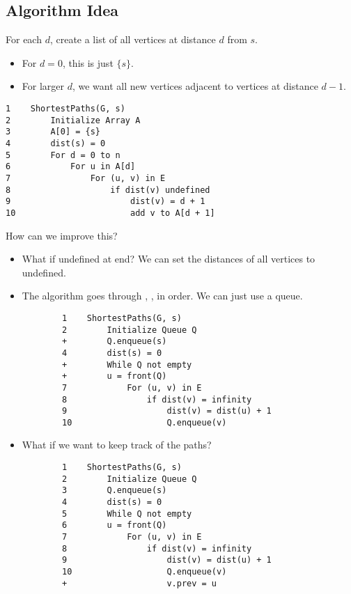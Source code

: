 \documentclass[letterpaper]{article}
\begin{document}
\subsection{Algorithm Idea}
For each $d$, create a list of all vertices at distance $d$ from $s$.
\begin{itemize}
    \item For $d = 0$, this is just $\{s\}$.
    \item For larger $d$, we want all new vertices adjacent to vertices at distance $d - 1$.
\end{itemize}

\begin{verbatim}
1    ShortestPaths(G, s)
2        Initialize Array A
3        A[0] = {s}
4        dist(s) = 0
5        For d = 0 to n
6            For u in A[d]
7                For (u, v) in E
8                    if dist(v) undefined
9                        dist(v) = d + 1
10                       add v to A[d + 1]
\end{verbatim}

How can we improve this?
\begin{itemize}
    \item What if  undefined at end? We can set the distances of all vertices to undefined. 
    \item The algorithm goes through , , in order. We can just use a queue.
    \begin{verbatim}
        1    ShortestPaths(G, s)
        2        Initialize Queue Q
        +        Q.enqueue(s)
        4        dist(s) = 0
        +        While Q not empty
        +        u = front(Q) 
        7            For (u, v) in E
        8                if dist(v) = infinity
        9                    dist(v) = dist(u) + 1
        10                   Q.enqueue(v)
        \end{verbatim}

    \item What if we want to keep track of the paths? 
    \begin{verbatim}
        1    ShortestPaths(G, s)
        2        Initialize Queue Q
        3        Q.enqueue(s)
        4        dist(s) = 0
        5        While Q not empty
        6        u = front(Q) 
        7            For (u, v) in E
        8                if dist(v) = infinity
        9                    dist(v) = dist(u) + 1
        10                   Q.enqueue(v)
        +                    v.prev = u
        \end{verbatim}
\end{itemize}
\end{document}
